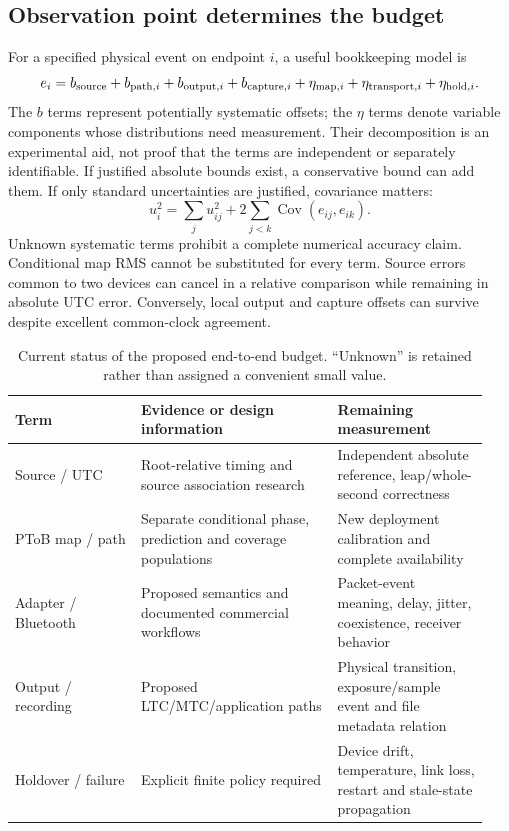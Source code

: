 \documentclass[11pt,letterpaper]{article}
\begin{document}
\subsection{Observation point determines the budget}
For a specified physical event on endpoint $i$, a useful bookkeeping model is
\begin{equation}
 e_i=b_{\rm source}+b_{{\rm path},i}+b_{{\rm output},i}+b_{{\rm capture},i}
       +\eta_{{\rm map},i}+\eta_{{\rm transport},i}+\eta_{{\rm hold},i}.
 \label{eq:error}
\end{equation}
The $b$ terms represent potentially systematic offsets; the $\eta$ terms denote variable components whose distributions need measurement. Their decomposition is an experimental aid, not proof that the terms are independent or separately identifiable. If justified absolute bounds exist, a conservative bound can add them. If only standard uncertainties are justified, covariance matters:
\begin{equation}
 u_i^2=\sum_j u_{ij}^2+2\sum_{j<k}\operatorname{Cov}(e_{ij},e_{ik}).\label{eq:cov}
\end{equation}
Unknown systematic terms prohibit a complete numerical accuracy claim. Conditional map RMS cannot be substituted for every term. Source errors common to two devices can cancel in a relative comparison while remaining in absolute UTC error. Conversely, local output and capture offsets can survive despite excellent common-clock agreement.

\begin{table}[htbp]\centering\small
\caption{Current status of the proposed end-to-end budget. ``Unknown'' is retained rather than assigned a convenient small value.}\label{tab:budget}
\begin{tabular}{@{}L{0.25\linewidth}L{0.39\linewidth}L{0.30\linewidth}@{}}\toprule
Term & Evidence or design information & Remaining measurement\\\midrule
Source / UTC & Root-relative timing and source association research & Independent absolute reference, leap/whole-second correctness\\\addlinespace
PToB map / path & Separate conditional phase, prediction and coverage populations & New deployment calibration and complete availability\\\addlinespace
Adapter / Bluetooth & Proposed semantics and documented commercial workflows & Packet-event meaning, delay, jitter, coexistence, receiver behavior\\\addlinespace
Output / recording & Proposed LTC/MTC/application paths & Physical transition, exposure/sample event and file metadata relation\\\addlinespace
Holdover / failure & Explicit finite policy required & Device drift, temperature, link loss, restart and stale-state propagation\\\bottomrule
\end{tabular}
\end{table}
\end{document}
